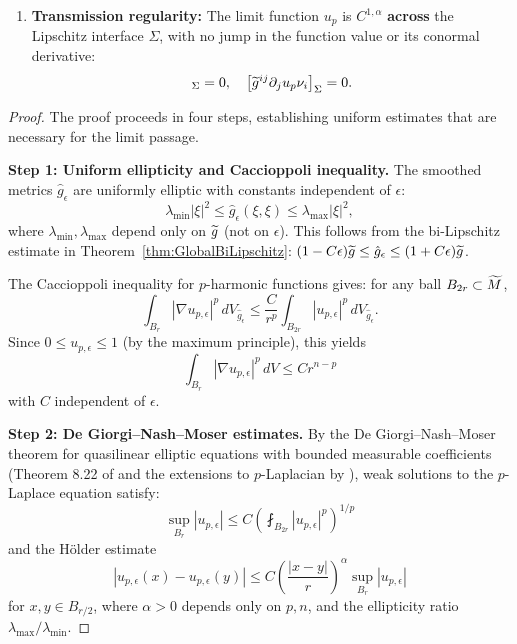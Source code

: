 \begin{theorem}
\begin{enumerate}
    \item \textbf{Transmission regularity:} The limit function $u_p$ is $C^{1,\alpha}$ \textbf{across} the Lipschitz interface $\Sigma$, with no jump in the function value or its conormal derivative:
    \begin{equation}
        [u_p]_\Sigma = 0, \quad \left[\tg^{ij} \partial_j u_p \nu_i \right]_\Sigma = 0.
    \end{equation}
\end{enumerate}
\end{theorem}

\begin{proof}
The proof proceeds in four steps, establishing uniform estimates that are necessary for the limit passage.

\textbf{Step 1: Uniform ellipticity and Caccioppoli inequality.}
The smoothed metrics $\hat{g}_\epsilon$ are uniformly elliptic with constants independent of $\epsilon$:
\begin{equation}
    \lambda_{\min} |\xi|^2 \le \hat{g}_\epsilon(\xi, \xi) \le \lambda_{\max} |\xi|^2,
\end{equation}
where $\lambda_{\min}, \lambda_{\max}$ depend only on $\widetilde{g}$ (not on $\epsilon$). This follows from the bi-Lipschitz estimate in Theorem~\ref{thm:GlobalBiLipschitz}: $(1-C\epsilon)\widetilde{g} \le \hat{g}_\epsilon \le (1+C\epsilon)\widetilde{g}$.

The Caccioppoli inequality for $p$-harmonic functions gives: for any ball $B_{2r} \subset \widetilde{M}$,
\begin{equation}
    \int_{B_r} |\nabla u_{p,\epsilon}|^p \, dV_{\hat{g}_\epsilon} \le \frac{C}{r^p} \int_{B_{2r}} |u_{p,\epsilon}|^p \, dV_{\hat{g}_\epsilon}.
\end{equation}
Since $0 \le u_{p,\epsilon} \le 1$ (by the maximum principle), this yields
\begin{equation}
    \int_{B_r} |\nabla u_{p,\epsilon}|^p \, dV \le C r^{n-p}
\end{equation}
with $C$ independent of $\epsilon$.

\textbf{Step 2: De Giorgi--Nash--Moser estimates.}
By the De Giorgi--Nash--Moser theorem for quasilinear elliptic equations with bounded measurable coefficients (Theorem 8.22 of \cite{gilbarg2001} and the extensions to $p$-Laplacian by \cite{dibenedetto1993}), weak solutions to the $p$-Laplace equation satisfy:
\begin{equation}
    \sup_{B_r} |u_{p,\epsilon}| \le C \left( \fint_{B_{2r}} |u_{p,\epsilon}|^p \right)^{1/p}
\end{equation}
and the H\"older estimate
\begin{equation}
    |u_{p,\epsilon}(x) - u_{p,\epsilon}(y)| \le C \left( \frac{|x-y|}{r} \right)^\alpha \sup_{B_r} |u_{p,\epsilon}|
\end{equation}
for $x, y \in B_{r/2}$, where $\alpha > 0$ depends only on $p, n$, and the ellipticity ratio $\lambda_{\max}/\lambda_{\min}$.


\end{proof}
